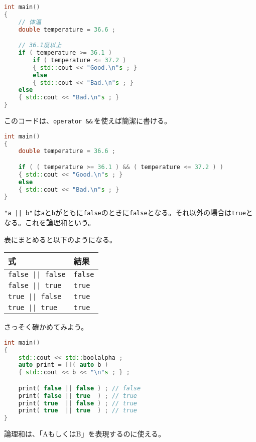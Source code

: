 \begin{lstlisting}[language={C++}]
int main()
{
    // 体温
    double temperature = 36.6 ;

    // 36.1度以上
    if ( temperature >= 36.1 )
        if ( temperature <= 37.2 )
        { std::cout << "Good.\n"s ; }
        else
        { std::cout << "Bad.\n"s ; }
    else
    { std::cout << "Bad.\n"s ; }
}
\end{lstlisting}

このコードは、\texttt{operator \&\&}\,を使えば簡潔に書ける。

\begin{lstlisting}[language={C++}]
int main()
{
    double temperature = 36.6 ;

    if ( ( temperature >= 36.1 ) && ( temperature <= 37.2 ) )
    { std::cout << "Good.\n"s ; }
    else
    { std::cout << "Bad.\n"s ; }
}
\end{lstlisting}


\texttt{"a || b"}\,は\texttt{a}と\texttt{b}がともに\texttt{false}のときに\texttt{false}となる。それ以外の場合は\texttt{true}となる。これを論理和という。

表にまとめると以下のようになる。

\begin{small}
\begin{longtable}[]{@{\,\,}ll@{\,\,}}
\hline%
\textsf{式} & \textsf{結果}\tabularnewline
\hline%
\endhead
\texttt{false || false} & \texttt{false}\tabularnewline
\texttt{false || true} & \texttt{true}\tabularnewline
\texttt{true  || false} & \texttt{true}\tabularnewline
\texttt{true  || true} & \texttt{true}\tabularnewline
\hline%
\end{longtable}
\end{small}

さっそく確かめてみよう。

\begin{lstlisting}[language={C++}]
int main()
{
    std::cout << std::boolalpha ;
    auto print = []( auto b )
    { std::cout << b << "\n"s ; } ;

    print( false || false ) ; // false
    print( false || true  ) ; // true
    print( true  || false ) ; // true
    print( true  || true  ) ; // true
}
\end{lstlisting}

論理和は、「AもしくはB」を表現するのに使える。

